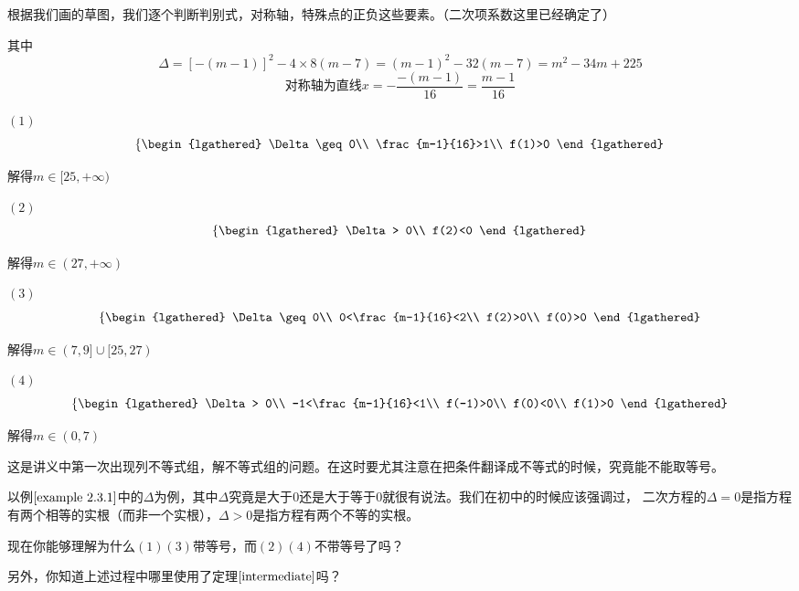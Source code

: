 \begin{jie}
根据我们画的草图，我们逐个判断判别式，对称轴，特殊点的正负这些要素。（二次项系数这里已经确定了）

其中\[\Delta=[-(m-1)]^2-4\times8(m-7)=(m-1)^2-32(m-7)=m^2-34m+225\]
\[\text{对称轴为直线}x=-\frac{-(m-1)}{16}=\frac{m-1}{16}\]

$(1)$ 
\[  
    \left\{
    \begin{lgathered}
    \Delta\geq 0\\
    \frac{m-1}{16}>1\\
    f(1)>0
    \end{lgathered}
    \right.
\]

解得$m \in [25,+\infty)$

$(2)$
\[  
    \left\{
    \begin{lgathered}
    \Delta > 0\\
    f(2)<0
    \end{lgathered}
    \right.
\]

解得$m \in (27,+\infty)$

$(3)$
\[  
    \left\{
    \begin{lgathered}
    \Delta \geq 0\\
    0<\frac{m-1}{16}<2\\
    f(2)>0\\
    f(0)>0
    \end{lgathered}
    \right.
\]

解得$m \in (7,9]\cup[25,27)$

$(4)$
\[  
    \left\{
    \begin{lgathered}
    \Delta > 0\\
    -1<\frac{m-1}{16}<1\\
    f(-1)>0\\
    f(0)<0\\
    f(1)>0
    \end{lgathered}
    \right.
\]

解得$m \in (0,7)$
\end{jie}
\begin{att}
这是讲义中第一次出现列不等式组，解不等式组的问题。在这时要尤其注意在把条件翻译成不等式的时候，究竟能不能取等号。

以例$\ref*{example 2.3.1}$中的$\Delta$为例，其中$\Delta$究竟是大于$0$还是大于等于$0$就很有说法。我们在初中的时候应该强调过，
二次方程的$\Delta=0$是指方程有两个相等的实根（而非一个实根），$\Delta>0$是指方程有两个不等的实根。

现在你能够理解为什么$(1)(3)$带等号，而$(2)(4)$不带等号了吗？

另外，你知道上述过程中哪里使用了定理$\ref*{intermediate}$吗？
\end{att}

